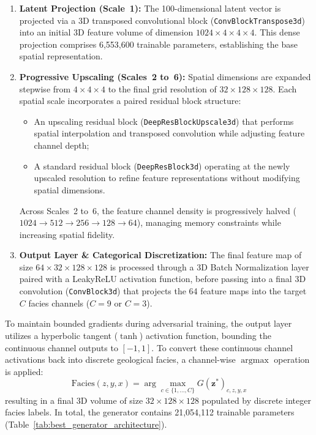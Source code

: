 \begin{enumerate}
    \item \textbf{Latent Projection (Scale~1):} The 100-dimensional latent vector is projected via a 3D transposed convolutional block (\texttt{ConvBlockTranspose3d}) into an initial 3D feature volume of dimension $1024 \times 4 \times 4 \times 4$. This dense projection comprises 6,553,600 trainable parameters, establishing the base spatial representation.
    \item \textbf{Progressive Upscaling (Scales~2 to~6):} Spatial dimensions are expanded stepwise from $4 \times 4 \times 4$ to the final grid resolution of $32 \times 128 \times 128$. Each spatial scale incorporates a paired residual block structure:
    \begin{itemize}
        \item An upscaling residual block (\texttt{DeepResBlockUpscale3d}) that performs spatial interpolation and transposed convolution while adjusting feature channel depth;
        \item A standard residual block (\texttt{DeepResBlock3d}) operating at the newly upscaled resolution to refine feature representations without modifying spatial dimensions.
    \end{itemize}
    Across Scales~2 to~6, the feature channel density is progressively halved ($1024 \to 512 \to 256 \to 128 \to 64$), managing memory constraints while increasing spatial fidelity.
    \item \textbf{Output Layer \& Categorical Discretization:} The final feature map of size $64 \times 32 \times 128 \times 128$ is processed through a 3D Batch Normalization layer paired with a LeakyReLU activation function, before passing into a final 3D convolution (\texttt{ConvBlock3d}) that projects the 64 feature maps into the target $C$ facies channels ($C=9$ or $C=3$).
\end{enumerate}

To maintain bounded gradients during adversarial training, the output layer utilizes a hyperbolic tangent ($\tanh$) activation function, bounding the continuous channel outputs to $[-1, 1]$. To convert these continuous channel activations back into discrete geological facies, a channel-wise $\operatorname{argmax}$ operation is applied:
\begin{equation}
    \text{Facies}(z, y, x) = \arg\max_{c \in \{1, \dots, C\}} G(\mathbf{z}^*)_{c, z, y, x}
\end{equation}
resulting in a final 3D volume of size $32 \times 128 \times 128$ populated by discrete integer facies labels. In total, the generator contains 21,054,112 trainable parameters (Table~\ref{tab:best_generator_architecture}).

